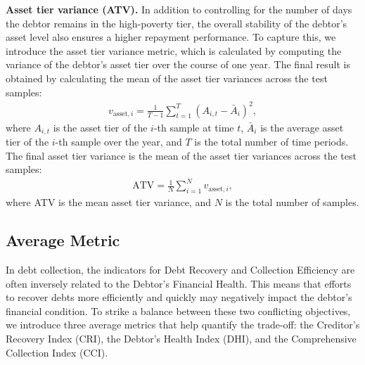 \textbf{Asset tier variance (ATV).} In addition to controlling for the number of days the debtor remains in the high-poverty tier, the overall stability of the debtor's asset level also ensures a higher repayment performance. To capture this, we introduce the asset tier variance metric, which is calculated by computing the variance of the debtor's asset tier over the course of one year. The final result is obtained by calculating the mean of the asset tier variances across the test samples:
\begin{equation}
\begin{split}
v_{\text{asset},i} = \frac{1}{T-1} \sum_{t=1}^{T} \left( A_{i,t} - \bar{A}_i \right)^2,
\end{split}
\end{equation}
where $A_{i,t}$ is the asset tier of the $i$-th sample at time $t$, $\bar{A}_i$ is the average asset tier of the $i$-th sample over the year, and $T$ is the total number of time periods. The final asset tier variance is the mean of the asset tier variances across the test samples:
\begin{equation}
\begin{split}
\text{ATV} = \frac{1}{N} \sum_{i=1}^{N} v_{\text{asset},i},
\end{split}
\end{equation}
where ATV is the mean asset tier variance, and $N$ is the total number of samples.

\subsection{Average Metric} \label{app:me_ave}

In debt collection, the indicators for Debt Recovery and Collection Efficiency are often inversely related to the Debtor’s Financial Health. This means that efforts to recover debts more efficiently and quickly may negatively impact the debtor's financial condition. To strike a balance between these two conflicting objectives, we introduce three average metrics that help quantify the trade-off: the Creditor’s Recovery Index (CRI), the Debtor’s Health Index (DHI), and the Comprehensive Collection Index (CCI).

